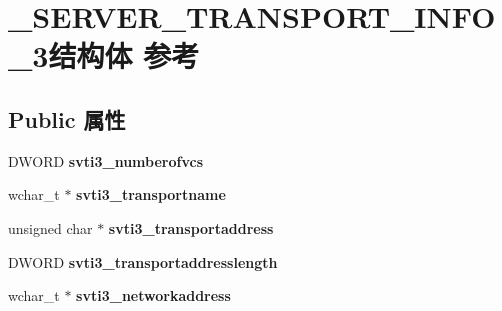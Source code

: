\hypertarget{struct___s_e_r_v_e_r___t_r_a_n_s_p_o_r_t___i_n_f_o__3}{}\section{\+\_\+\+S\+E\+R\+V\+E\+R\+\_\+\+T\+R\+A\+N\+S\+P\+O\+R\+T\+\_\+\+I\+N\+F\+O\+\_\+3结构体 参考}
\label{struct___s_e_r_v_e_r___t_r_a_n_s_p_o_r_t___i_n_f_o__3}
\subsection*{Public 属性}
\begin{DoxyCompactItemize}
\item 
\mbox{\label{struct___s_e_r_v_e_r___t_r_a_n_s_p_o_r_t___i_n_f_o__3_a92dae072673d40ae2a2194f85f720dd5}} 
D\+W\+O\+RD {\bfseries svti3\+\_\+numberofvcs}
\item 
\mbox{\label{struct___s_e_r_v_e_r___t_r_a_n_s_p_o_r_t___i_n_f_o__3_a3b10bde51418e91e045aa381f714e30b}} 
wchar\+\_\+t $\ast$ {\bfseries svti3\+\_\+transportname}
\item 
\mbox{\label{struct___s_e_r_v_e_r___t_r_a_n_s_p_o_r_t___i_n_f_o__3_a20d7bf9741b96f6899bd3c113cfa0e68}} 
unsigned char $\ast$ {\bfseries svti3\+\_\+transportaddress}
\item 
\mbox{\label{struct___s_e_r_v_e_r___t_r_a_n_s_p_o_r_t___i_n_f_o__3_ae102d617d6a17f33130e817d032ad9c3}} 
D\+W\+O\+RD {\bfseries svti3\+\_\+transportaddresslength}
\item 
\mbox{\label{struct___s_e_r_v_e_r___t_r_a_n_s_p_o_r_t___i_n_f_o__3_ad1fec9f3ca6c5d1e31ba07595279f849}} 
wchar\+\_\+t $\ast$ {\bfseries svti3\+\_\+networkaddress}
\item 
\mbox{\label{struct___s_e_r_v_e_r___t_r_a_n_s_p_o_r_t___i_n_f_o__3_a65ed060e4051deb141c99d02d3e86d03}} 

\end{DoxyCompactItemize}
